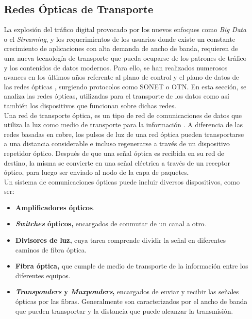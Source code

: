 \subsection{Redes Ópticas de Transporte}
La explosión del tráfico digital provocado por los nuevos enfoques como \textit{Big Data} o el \textit{Streaming}, y los requerimientos de los usuarios donde existe un constante crecimiento de aplicaciones con alta demanda de ancho de banda, requieren de una nueva tecnología de transporte que pueda ocuparse de los patrones de tráfico y los contenidos de datos modernos. Para ello, se han realizados numerosos avances en los últimos años referente al plano de control y el plano de datos de las redes ópticas \parencite{redesopticas}, surgiendo protocolos como SONET o OTN. En esta sección, se analiza las redes ópticas, utilizadas para el transporte de los datos como así también los dispositivos que funcionan sobre dichas redes. 
\\

Una red de transporte óptica, es un tipo de red de comunicaciones de datos que utiliza la luz como medio de transporte para la información \parencite{redesopticasdef}. A diferencia de las redes basadas en cobre, los pulsos de luz de una red óptica pueden transportarse a una distancia considerable e incluso regenerarse a través de un dispositivo repetidor óptico. Después de que una señal óptica es recibida en su red de destino, la misma se convierte en una señal eléctrica a través de un receptor óptico, para luego ser enviado al nodo de la capa de paquetes. 
\\

Un sistema de comunicaciones ópticas puede incluir diversos dispositivos, como ser:

\begin{itemize}
	\item \textbf{Amplificadores ópticos}. 
	\item \textbf{\textit{Switches} ópticos,} encargados de conmutar de un canal a otro.
	\item \textbf{Divisores de luz,} cuya tarea comprende dividir la señal en diferentes caminos de fibra óptica.
	\item \textbf{Fibra óptica,} que cumple de medio de transporte de la información entre los diferentes equipos.
	\item \textbf{\textit{Transponders} y \textit{Muxponders},} encargados de enviar y recibir las señales ópticas por las fibras. Generalmente son caracterizados por el ancho de banda que pueden transportar y la distancia que puede alcanzar la transmisión.
\end{itemize}

